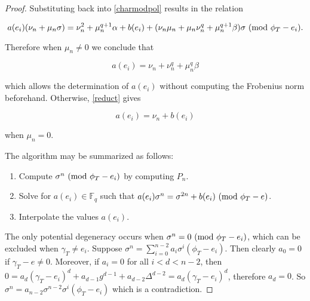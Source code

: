\documentclass{jams-l}
\theoremstyle{remark}
\numberwithin{equation}{section}
\begin{document}
\begin{proof}
\noindent Substituting back into \ref{charmodpol} results in the relation

\begin{equation} \label{reduct}
a(e_i) (\nu_n + \mu_n \sigma) = \nu_n^2 + \mu_n^{q + 1} \alpha + b(e_i) + (\nu_n \mu_n + \mu_n \nu_n^q + \mu_n^{q+1}\beta)\sigma \textnormal{ (mod } \phi_{T} - e_i \textnormal{)} .
\end{equation}

\noindent Therefore when $\mu_n \neq 0$ we conclude that

\[a(e_i) = \nu_n + \nu_n^q + \mu_n^q \beta \]

\noindent which allows the determination of $a(e_i)$ without computing the Frobenius norm beforehand. Otherwise, \ref{reduct} gives

\begin{equation}
a(e_i) = \nu_n + b(e_i)
\end{equation}

\noindent when $\mu_n = 0$.

The algorithm may be summarized as follows:

\begin{enumerate}

\item Compute $\sigma^n  \textnormal{ (mod } \phi_{T} - e_i \textnormal{)} $ by computing $P_n$.


\item Solve for $a(e_i) \in \mathbb{F}_q$ such that $a(e_i)\sigma^n = \sigma^{2n}+ b(e_i)  \textnormal{ (mod } \phi_{T} - e \textnormal{)} $.

\item Interpolate the values $a(e_i)$.

\end{enumerate}

The only potential degeneracy occurs when $\sigma^n = 0 \textnormal{ (mod } \phi_{T} - e_i \textnormal{)} $, which can be excluded when $\gamma_T \neq e_i$. Suppose $\sigma^n = \sum_{i=0}^{n-2} a_i \sigma^i(\phi_T - e_i)$. Then clearly $a_0 = 0$ if $\gamma_T - e \neq 0$. Moreover, if $a_i = 0$ for all $i < d < n - 2$, then $0 = a_{d} (\gamma_T - e_i)^d + a_{d-1}g^{d-1} + a_{d-2} \Delta^{d-2} = a_{d} (\gamma_T - e_i)^d$, therefore $a_d = 0$. So $\sigma^n = a_{n-2} \sigma^{n-2} \sigma^i(\phi_T - e_i)$ which is a contradiction.


\end{proof}
\end{document}
